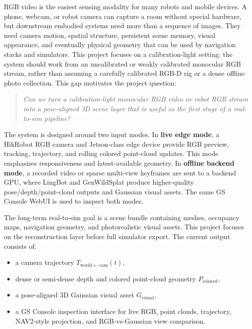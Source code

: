 \documentclass[11pt]{article}
\begin{document}
RGB video is the easiest sensing modality for many robots and mobile devices. A phone, webcam, or robot camera can capture a room without special hardware, but downstream embodied systems need more than a sequence of images. They need camera motion, spatial structure, persistent scene memory, visual appearance, and eventually physical geometry that can be used by navigation stacks and simulators. This project focuses on a calibration-light setting: the system should work from an uncalibrated or weakly calibrated monocular RGB stream, rather than assuming a carefully calibrated RGB-D rig or a dense offline photo collection. This gap motivates the project question:

\begin{quote}
\emph{Can we turn a calibration-light monocular RGB video or robot RGB stream into a pose-aligned 3D scene layer that is useful as the first stage of a real-to-sim pipeline?}
\end{quote}

The system is designed around two input modes. In \textbf{live edge mode}, a HikRobot RGB camera and Jetson-class edge device provide RGB preview, tracking, trajectory, and rolling colored point-cloud updates. This mode emphasizes responsiveness and latest-available geometry. In \textbf{offline backend mode}, a recorded video or sparse multi-view keyframes are sent to a backend GPU, where LingBot and GenWildSplat produce higher-quality pose/depth/point-cloud outputs and Gaussian visual assets. The same GS Console WebUI is used to inspect both modes.

The long-term real-to-sim goal is a scene bundle containing meshes, occupancy maps, navigation geometry, and photorealistic visual assets. This project focuses on the reconstruction layer before full simulator export. The current output consists of:

\begin{itemize}
    \item a camera trajectory \(T_{\mathrm{world}\leftarrow\mathrm{cam}}(t)\),
    \item dense or semi-dense depth and colored point-cloud geometry \(P_{\mathrm{colored}}\),
    \item a pose-aligned 3D Gaussian visual asset \(G_{\mathrm{visual}}\),
    \item a GS Console inspection interface for live RGB, point clouds, trajectory, NAV2-style projection, and RGB-vs-Gaussian view comparison.
\end{itemize}
\end{document}
